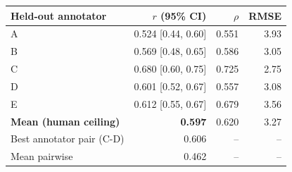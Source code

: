 \begin{tabular}{lrrr}
\toprule
Held-out annotator & $r$ (95\% CI) & $\rho$ & RMSE \\
\midrule
A & 0.524 [0.44, 0.60] & 0.551 & 3.93 \\
B & 0.569 [0.48, 0.65] & 0.586 & 3.05 \\
C & 0.680 [0.60, 0.75] & 0.725 & 2.75 \\
D & 0.601 [0.52, 0.67] & 0.557 & 3.08 \\
E & 0.612 [0.55, 0.67] & 0.679 & 3.56 \\
\midrule
\textbf{Mean (human ceiling)} & \textbf{0.597} & 0.620 & 3.27 \\
Best annotator pair (C-D) & 0.606 & -- & -- \\
Mean pairwise & 0.462 & -- & -- \\
\bottomrule
\end{tabular}